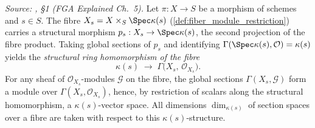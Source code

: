 \begin{definition}\leanok
  \label{def:fiber_sections_module}
  \textit{Source: \cite{nitsure-hilbert-quot}, \S 1 (FGA Explained Ch.~5).}
  Let \(\pi : X \to S\) be a morphism of schemes and \(s \in S\). The fibre
  \(X_s = X \times_S \Spec \kappa(s)\) (\cref{def:fiber_module_restriction})
  carries a structural morphism \(p_s : X_s \to \Spec \kappa(s)\), the second
  projection of the fibre product. Taking global sections of \(p_s\) and
  identifying \(\Gamma(\Spec \kappa(s), \mathcal{O}) = \kappa(s)\) yields the
  \emph{structural ring homomorphism of the fibre}
  \[
    \kappa(s) \;\longrightarrow\; \Gamma\bigl(X_s,\, \mathcal{O}_{X_s}\bigr).
  \]
  For any sheaf of \(\mathcal{O}_{X_s}\)-modules \(\mathcal{G}\) on the fibre,
  the global sections \(\Gamma(X_s, \mathcal{G})\) form a module over
  \(\Gamma(X_s, \mathcal{O}_{X_s})\), hence, by restriction of scalars along
  the structural homomorphism, a \(\kappa(s)\)-vector space. All dimensions
  \(\dim_{\kappa(s)}\) of section spaces over a fibre are taken with respect
  to this \(\kappa(s)\)-structure.
\end{definition}

